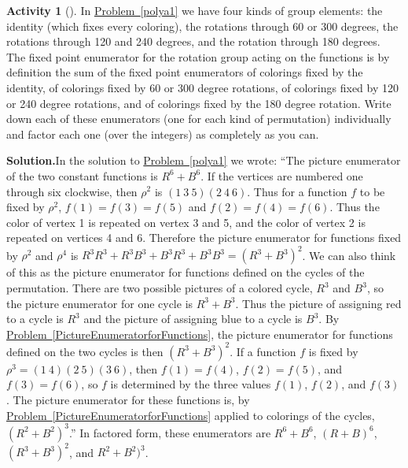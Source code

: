 \documentclass[10pt,]{book}
\theoremstyle{plain}
\theoremstyle{definition}
\newtheorem{activity}[project]{Activity}
\numberwithin{equation}{chapter}
\begin{document}
\begin{activity}[]\label{polya3}
In \hyperref[polya1]{Problem~\ref{polya1}} we have four kinds of group elements: the identity (which fixes every coloring), the rotations through 60 or 300 degrees, the rotations through 120 and 240 degrees, and the rotation through 180 degrees. The fixed point enumerator for the rotation group acting on the functions is by definition the sum of the fixed point enumerators of colorings fixed by the identity, of colorings fixed by 60 or 300 degree rotations, of colorings fixed by 120 or 240 degree rotations, and of colorings fixed by the 180 degree rotation. Write down each of these enumerators (one for each kind of permutation) individually and factor each one (over the integers) as completely as you can.%
\par\medskip\noindent%
\textbf{Solution.}\quad In the solution to \hyperref[polya1]{Problem~\ref{polya1}} we wrote: ``The picture enumerator of the two constant functions is \(R^6+B^6\). If the vertices are numbered one through six clockwise, then \(\rho^2\) is \((1\ 3\ 5)(2\ 4\ 6)\). Thus for a function \(f\) to be fixed by \(\rho^2\), \(f(1)=f(3)=f(5)\) and \(f(2)=f(4)=f(6)\). Thus the color of vertex 1 is repeated on vertex 3 and 5, and the color of vertex 2 is repeated on vertices 4 and 6. Therefore the picture enumerator for functions fixed by \(\rho^2\) and \(\rho^4\) is \(R^3R^3 +R^3B^3+B^3R^3 +B^3B^3=(R^3+B^3)^2\). We can also think of this as the picture enumerator for functions defined on the cycles of the permutation. There are two possible pictures of a colored cycle, \(R^3\) and \(B^3\), so the picture enumerator for one cycle is \(R^3+B^3\). Thus the picture of assigning red to a cycle is \(R^3\) and the picture of assigning blue to a cycle is \(B^3\). By \hyperref[PictureEnumeratorforFunctions]{Problem~\ref{PictureEnumeratorforFunctions}}, the picture enumerator for functions defined on the two cycles is then \((R^3+B^3)^2\). If a function \(f\) is fixed by \(\rho^3=(1\ 4)(2\ 5)(3\ 6)\), then \(f(1)=f(4)\), \(f(2)=f(5)\), and \(f(3)=f(6)\), so \(f\) is determined by the three values \(f(1)\), \(f(2)\), and \(f(3)\). The picture enumerator for these functions is, by \hyperref[PictureEnumeratorforFunctions]{Problem~\ref{PictureEnumeratorforFunctions}} applied to colorings of the cycles, \((R^2+B^2)^3\).'' In factored form, these enumerators are \(R^6+B^6\), \((R+B)^6\), \((R^3+B^3)^2\), and \(R^2+B^2)^3\).%
\end{activity}
\end{document}

